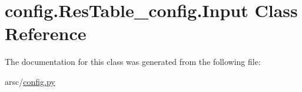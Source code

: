 \hypertarget{classconfig_1_1ResTable__config_1_1Input}{}\section{config.\+Res\+Table\+\_\+config.\+Input Class Reference}
\label{classconfig_1_1ResTable__config_1_1Input}


The documentation for this class was generated from the following file\+:\begin{DoxyCompactItemize}
\item 
arsc/\mbox{\hyperlink{config_8py}{config.\+py}}\end{DoxyCompactItemize}
